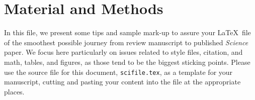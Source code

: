 
\section*{Material and Methods}

In this file, we present some tips and sample mark-up to assure your %
\LaTeX\ file of the smoothest possible journey from review manuscript %
to published {\it Science\/} paper.  We focus here particularly on
issues related to style files, citation, and math, tables, and
figures, as those tend to be the biggest sticking points.  Please use
the source file for this document, \texttt{scifile.tex}, as a template
for your manuscript, cutting and pasting your content into the file at
the appropriate places. 